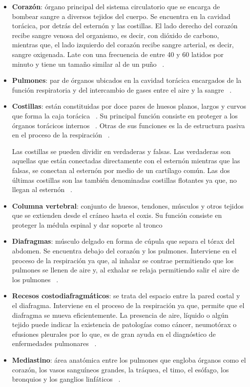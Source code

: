 \begin{itemize}
    \item \textbf{Corazón}: órgano principal del sistema circulatorio que se encarga de bombear sangre a diversos tejidos del cuerpo. Se encuentra en la cavidad torácica, por detrás del esternón y las costillas. El lado derecho del corazón recibe sangre venosa del organismo, es decir, con dióxido de carbono, mientras que, el lado izquierdo del corazón recibe sangre arterial, es decir, sangre oxigenada. Late con una frecuencia de entre 40 y 60 latidos por minuto y tiene un tamaño similar al de un puño ~\cite{CliUniNaCorazon24, CliUniNaSaVenosa24}.
    \item \textbf{Pulmones}: par de órganos ubicados en la cavidad torácica encargados de la función respiratoria y del intercambio de gases entre el aire y la sangre ~\cite{CliUniNaPulmon24}.
    \item \textbf{Costillas}: están constituidas por doce pares de huesos planos, largos y curvos que forma la caja torácica ~\cite{CliUniNaCostilla24}. Su principal función consiste en proteger a los órganos torácicos internos ~\cite{kenhub24}. Otras de sus funciones es la de estructura pasiva en el proceso de la respiración ~\cite{CliUniNaCostilla24}.

    Las costillas se pueden dividir en verdaderas y falsas. Las verdaderas son aquellas que están conectadas directamente con el esternón mientras que las falsas, se conectan al esternón por medio de un cartílago común. Las dos últimas costillas son las también denominadas costillas flotantes ya que, no llegan al esternón ~\cite{CliUniNaCostilla24, kenhub24}. 
    \item \textbf{Columna vertebral}: conjunto de huesos, tendones, músculos y otros tejidos que se extienden desde el cráneo hasta el coxis. Su función consiste en proteger la médula espinal y dar soporte al tronco ~\cite{NIHColVer24, MedliColVer24}
    \item \textbf{Diafragmas}: músculo delgado en forma de cúpula que separa el tórax del abdomen. Se encuentra debajo del corazón y los pulmones. Interviene en el proceso de la respiración ya que, al inhalar se contrae permitiendo que los pulmones se llenen de aire y, al exhalar se relaja permitiendo salir el aire de los pulmones ~\cite{NIHDiaf24, MedliColDiaf24, premiummadridDiaf24}.
    \item \textbf{Recesos costodiafragmáticos}: se trata del espacio entre la pared costal y el diafragma. Interviene en el proceso de la respiración ya que, permite que el diafragma se mueva eficientemente. La presencia de aire, líquido o algún tejido puede indicar la existencia de patologías como cáncer, neumotórax o efusiones pleurales por lo que, es de gran ayuda en el diagnóstico de enfermedades pulmonares ~\cite{CliUniNaReCostodiaf24}.
    \item \textbf{Mediastino}: área anatómica entre los pulmones que engloba órganos como el corazón, los vasos sanguíneos grandes, la tráquea, el timo, el esófago, los bronquios y los ganglios linfáticos ~\cite{NIHmediastino24}.
    
\end{itemize}

